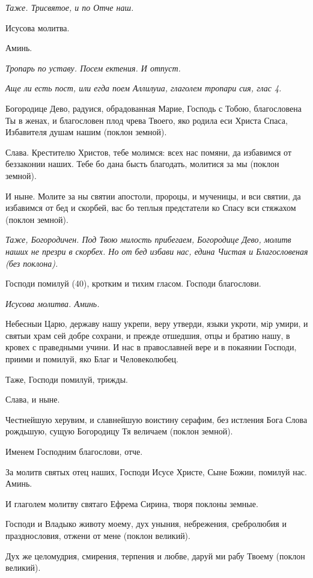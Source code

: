 \itshape Таже. Трисвятое, и по Отче наш.\normalfont{}


Исусова молитва.


Аминь.


\itshape Тропарь по уставу. Посем ектения. И отпуст.\normalfont{}


\itshape Аще ли есть пост, или егда поем Аллилуиа, глаголем тропари сия, глас 4.\normalfont{}


Богородице Дево, радуися, обрадованная Марие, Господь с Тобою, благословена Ты в женах, и благословен плод чрева Твоего, яко родила еси Христа Спаса, Избавителя душам нашим (поклон земной).


Слава. Крестителю Христов, тебе молимся: всех нас помяни, да избавимся от беззаконии наших. Тебе бо дана бысть благодать, молитися за мы (поклон земной).


И ныне. Молите за ны святии апостоли, пророцы, и мученицы, и вси святии, да избавимся от бед и скорбей, вас бо теплыя предстатели ко Спасу вси стяжахом (поклон земной).


\itshape Таже, Богородичен.\normalfont{} Под Твою милость прибегаем, Богородице Дево, молитв наших не презри в скорбех. Но от бед избави нас, едина Чистая и Благословеная (без поклона).


Господи помилуй (40), кротким и тихим гласом. Господи благослови.


\itshape Исусова молитва.\normalfont{} Аминь.


Небесныи Царю, державу нашу укрепи, веру утверди, языки укроти, мiр умири, и святыи храм сей добре сохрани, и прежде отшедшия, отцы и братию нашу, в кровех с праведными учини. И нас в православней вере и в покаянии Господи, приими и помилуй, яко Благ и Человеколюбец.


Таже, Господи помилуй, трижды.


Слава, и ныне.


Честнейшую херувим, и славнейшую воистину серафим, без истления Бога Слова рождьшую, сущую Богородицу Тя величаем (поклон земной).


Именем Господним благослови, отче.


За молитв святых отец наших, Господи Исусе Христе, Сыне Божии, помилуй нас. Аминь.


И глаголем молитву святаго Ефрема Сирина, творя поклоны земные.


Господи и Владыко животу моему, дух уныния, небрежения, сребролюбия и празднословия, отжени от мене (поклон великий).


Дух же целомудрия, смирения, терпения и любве, даруй ми рабу Твоему (поклон великий).


